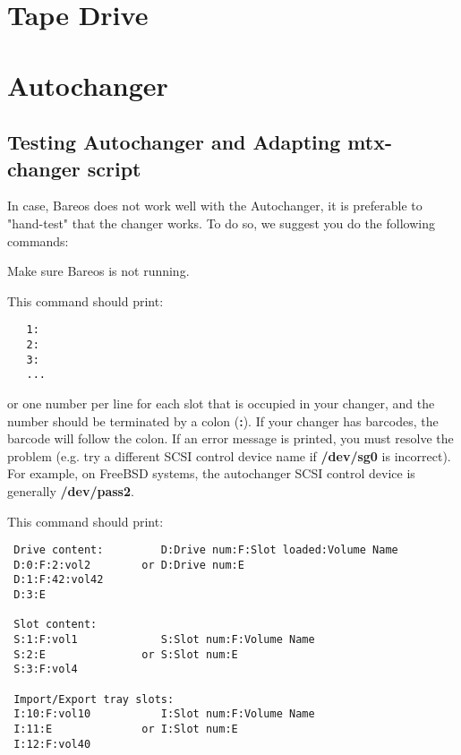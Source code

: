 
\section{Tape Drive}
\label{TapeTestingChapter}



\section{Autochanger}

\subsection{Testing Autochanger and Adapting mtx-changer script}
\label{AutochangerTesting}

In case, Bareos does not work well with the Autochanger,
it is preferable to
"hand-test" that the changer works. To do so, we suggest you do the
following commands:

Make sure Bareos is not running.


This command should print:

\footnotesize
\begin{verbatim}
   1:
   2:
   3:
   ...

\end{verbatim}
\normalsize

or one number per line for each slot that is  occupied in your changer, and
the number should be  terminated by a colon ({\bf :}). If your changer has
barcodes, the barcode will follow the colon.  If an error message is printed,
you must resolve the  problem (e.g. try a different SCSI control device name
if {\bf /dev/sg0}  is incorrect). For example, on FreeBSD systems, the
autochanger  SCSI control device is generally {\bf /dev/pass2}.


This command should print:

\footnotesize
\begin{verbatim}
 Drive content:         D:Drive num:F:Slot loaded:Volume Name
 D:0:F:2:vol2        or D:Drive num:E
 D:1:F:42:vol42
 D:3:E

 Slot content:
 S:1:F:vol1             S:Slot num:F:Volume Name
 S:2:E               or S:Slot num:E
 S:3:F:vol4

 Import/Export tray slots:
 I:10:F:vol10           I:Slot num:F:Volume Name
 I:11:E              or I:Slot num:E
 I:12:F:vol40

\end{verbatim}
\normalsize

